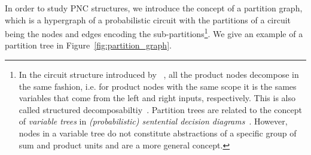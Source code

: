 \documentclass[letterpaper]{article} %
\newcommand{\ie}{i.e.\xspace}
\begin{document}
In order to study PNC structures, we introduce the concept of a partition graph, which is a hypergraph of a probabilistic circuit with the partitions of a circuit being the nodes and edges encoding the sub-partitions\footnote{In the circuit structure introduced by ~\citet{shih2021hyperspns}, all the product nodes decompose in the same fashion, \ie for product nodes with the same scope it is the sames variables that come from the left and right inputs, respectively. This is also called structured decomposabiltiy~\citep{darwiche2011sdd}. Partition trees are related to the concept of \textit{variable trees} in \textit{(probabilistic) sentential decision diagrams}~\citep{darwiche2011sdd,kisa2014probabilistic}. However, nodes in a variable tree do not constitute abstractions of a specific group of sum and product units and are a more general concept. }.  We give an example of a partition tree in Figure~\ref{fig:partition_graph}.
\end{document}
